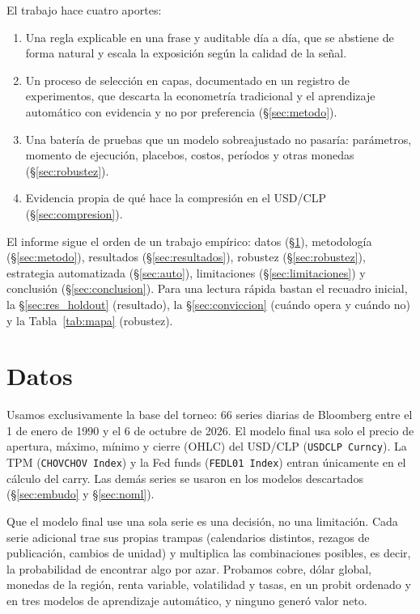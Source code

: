 \documentclass[10pt,a4paper]{article}
\begin{document}
El trabajo hace cuatro aportes:
\begin{enumerate}[label=(\roman*)]
  \item Una regla explicable en una frase y auditable día a día, que se abstiene de
        forma natural y escala la exposición según la calidad de la señal.
  \item Un proceso de selección en capas, documentado en un registro de experimentos,
        que descarta la econometría tradicional y el aprendizaje automático con
        evidencia y no por preferencia (§\ref{sec:metodo}).
  \item Una batería de pruebas que un modelo sobreajustado no pasaría: parámetros,
        momento de ejecución, placebos, costos, períodos y otras monedas
        (§\ref{sec:robustez}).
  \item Evidencia propia de qué hace la compresión en el USD/CLP
        (§\ref{sec:compresion}).
\end{enumerate}

El informe sigue el orden de un trabajo empírico: datos (§\ref{sec:datos}),
metodología (§\ref{sec:metodo}), resultados (§\ref{sec:resultados}), robustez
(§\ref{sec:robustez}), estrategia automatizada (§\ref{sec:auto}), limitaciones
(§\ref{sec:limitaciones}) y conclusión (§\ref{sec:conclusion}). Para una lectura
rápida bastan el recuadro inicial, la §\ref{sec:res_holdout} (resultado), la
§\ref{sec:conviccion} (cuándo opera y cuándo no) y la Tabla~\ref{tab:mapa} (robustez).

\section{Datos}\label{sec:datos}

Usamos exclusivamente la base del torneo: 66 series diarias de Bloomberg entre el 1 de
enero de 1990 y el 6 de octubre de 2026. El modelo final usa solo el precio de apertura,
máximo, mínimo y cierre (OHLC) del USD/CLP (\texttt{USDCLP Curncy}). La TPM
(\texttt{CHOVCHOV Index}) y la Fed funds (\texttt{FEDL01 Index}) entran únicamente en el
cálculo del carry. Las demás series se usaron en los modelos descartados
(§\ref{sec:embudo} y §\ref{sec:noml}).

Que el modelo final use una sola serie es una decisión, no una limitación. Cada serie
adicional trae sus propias trampas (calendarios distintos, rezagos de publicación,
cambios de unidad) y multiplica las combinaciones posibles, es decir, la probabilidad de
encontrar algo por azar. Probamos cobre, dólar global, monedas de la región, renta
variable, volatilidad y tasas, en un probit ordenado y en tres modelos de aprendizaje
automático, y ninguno generó valor neto.
\end{document}
